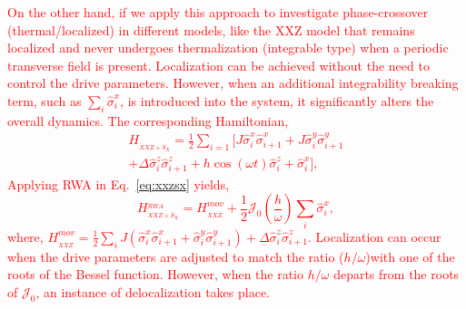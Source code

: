 \documentclass[%
reprint,
superscriptaddress,
amsmath,amssymb,
aps,
prb,
showkeys,
]{revtex4-2}
\newcommand{\red}[1]{\textcolor{red}{#1}}
\begin{document}
	\red{On the other hand, if we apply this approach to investigate phase-crossover (thermal/localized) in different models, like the XXZ model that remains localized and never undergoes thermalization (integrable type) when a periodic transverse field is present. Localization can be achieved without the need to control the drive parameters. However, when an additional integrability breaking term, such as $\sum_i \hat{\sigma}^x_i$, is introduced into the system, it significantly alters the overall dynamics. The corresponding Hamiltonian,
	\begin{multline}
		H_{_{XXZ+S_{X}}} = \frac12 \sum_{i=1} \bigg[ J \hat{\sigma}^x_i \hat{\sigma}^x_{i+1} +J  \hat{\sigma}^y_i \hat{\sigma}^y_{i+1}\\ + \Delta  \hat{\sigma}^z_i \hat{\sigma}^z_{i+1} + h\cos(\omega t)  \hat{\sigma}^z_i + \hat{\sigma}^x_i\bigg],
		\label{eq:xxzsx}
	\end{multline}
	Applying RWA in Eq.~\eqref{eq:xxzsx} yields,
	\begin{equation}
		H_{_{XXZ+S_{X}}}^{_{RWA}} =H_{_{XXZ}}^{mov} +  \frac12 \mathcal{J}_0 \left(\frac{h}{\omega}\right)\sum_i \hat{\sigma}^x_i,
		\label{eq:xxzsxrwa}
	\end{equation}
	where, $\displaystyle H_{_{XXZ}}^{mov} =\frac12 \sum_i J\left( \hat{\sigma}^x_i \hat{\sigma}^x_{i+1} + \hat{\sigma}^y_i \hat{\sigma}^y_{i+1} \right) + \Delta \hat{\sigma}_{i}^{z} \hat{\sigma}_{i+1}^{z}$. Localization can occur when the drive parameters are adjusted to match the ratio ($h/\omega$)with one of the roots of the Bessel function. However, when the ratio $h/\omega$ departs from the roots of $\mathcal{J}_0$, an instance of delocalization takes place.}
\end{document}
